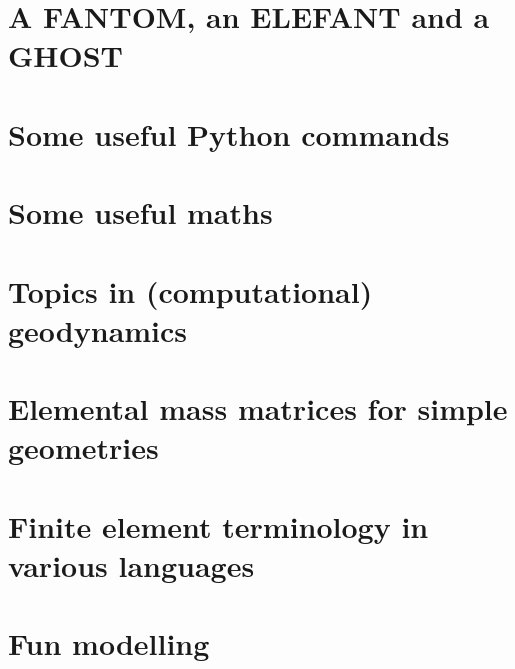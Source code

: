 \documentclass[a4paper]{article}
\begin{document}
\section{A FANTOM, an ELEFANT and a GHOST}  %
\newpage %
\section{Some useful Python commands}  %
\newpage %
\section{Some useful maths}  \label{app_maths} %
\newpage %
\section{Topics in (computational) geodynamics} \label{app:topics} %
\newpage %
\section{Elemental mass matrices for simple geometries}\label{app:mm} 
\newpage %
\section{Finite element terminology in various languages}  %
\newpage %
\section{Fun modelling}  %
\newpage %



\newpage %
{\small } %
\printindex %
\newpage %

\listoftodos[Notes] %
\end{document}
